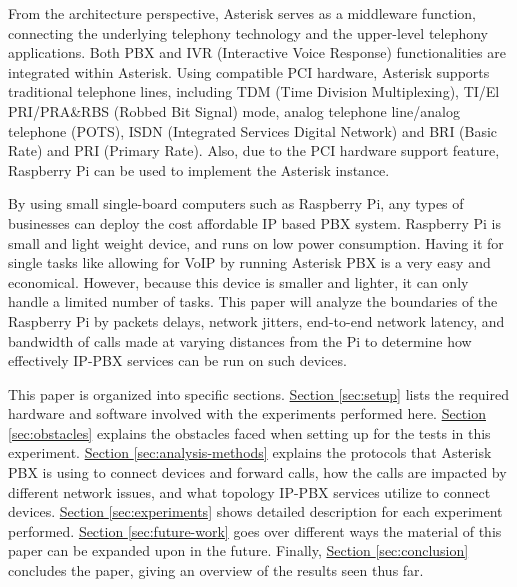 From the architecture perspective, Asterisk serves as a middleware function, connecting the underlying telephony technology and the upper-level telephony applications. Both PBX and IVR (Interactive Voice Response) functionalities are integrated within Asterisk. Using compatible PCI hardware, Asterisk supports traditional telephone lines, including TDM (Time Division Multiplexing), TI/El PRI/PRA\&RBS (Robbed Bit Signal) mode, analog telephone line/analog telephone (POTS), ISDN (Integrated Services Digital Network) and BRI (Basic Rate) and PRI (Primary Rate). Also, due to the PCI hardware support feature, Raspberry Pi can be used to implement the Asterisk instance. 

By using small single-board computers such as Raspberry Pi, any types of businesses can deploy the cost affordable IP based PBX system. Raspberry Pi is small and light weight device, and runs on low power consumption. Having it for single tasks like allowing for VoIP by running Asterisk PBX is a very easy and economical. However, because this device is smaller and lighter, it can only handle a limited number of tasks. This paper will analyze the boundaries of the Raspberry Pi by packets delays, network jitters, end-to-end network latency, and bandwidth of calls made at varying distances from the Pi to determine how effectively IP-PBX services can be run on such devices.
	
This paper is organized into specific sections. \hyperref[sec:setup]{Section \ref{sec:setup}} lists the required hardware and software involved with the experiments performed here.  \hyperref[sec:obstacles]{Section \ref{sec:obstacles}} explains the obstacles faced when setting up for the tests in this experiment. \hyperref[sec:analysis-methods]{Section \ref{sec:analysis-methods}} explains the protocols that Asterisk PBX is using to connect devices and forward calls, how the calls are impacted by different network issues, and what topology IP-PBX services utilize to connect devices. \hyperref[sec:experiments]{Section \ref{sec:experiments}} shows detailed description for each experiment performed. \hyperref[sec:future-work]{Section \ref{sec:future-work}} goes over different ways the material of this paper can be expanded upon in the future. Finally, \hyperref[sec:conclusion]{Section \ref{sec:conclusion}} concludes the paper, giving an overview of the results seen thus far.